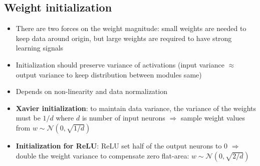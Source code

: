 \subsection{Weight initialization}
\begin{itemize}
	\item There are two forces on the weight magnitude: small weights are needed to keep data around origin, but large weights are required to have strong learning signals
	\item Initialization should preserve variance of activations (input variance $\approx$ output variance to keep distribution between modules same)
	\item Depends on non-linearity and data normalization
	\item \textbf{Xavier initialization}: to maintain data variance, the variance of the weights must be $1/d$ where $d$ is number of input neurons $\Rightarrow$ sample weight values from $w\sim\mathcal{N}(0,\sqrt{1/d})$
	\item \textbf{Initialization for ReLU}: ReLU set half of the output neurons to 0 $\Rightarrow$ double the weight variance to compensate zero flat-area: $w\sim\mathcal{N}(0,\sqrt{2/d})$
\end{itemize}